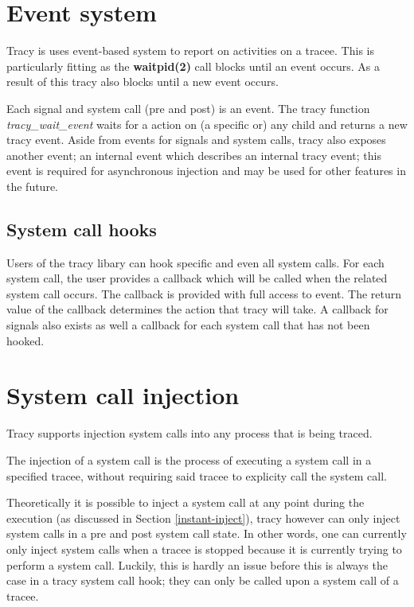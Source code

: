 \documentclass[a4paper, 10pt]{report}
\begin{document}

\section{Event system}

Tracy is uses event-based system to report on activities on a tracee. This is
particularly fitting as the \textbf{waitpid(2)} call blocks until an event
occurs. As a result of this tracy also blocks until a new event occurs.

Each signal and system call (pre and post) is an event.
The tracy function \textit{tracy\_wait\_event} waits for a action on
(a specific or) any child and returns a new tracy event. Aside from
events for signals and system calls, tracy also exposes another event; an
internal event which describes an internal tracy event; this event is required
for asynchronous injection and may be used for other features in the future.

\subsection{System call hooks}

Users of the tracy libary can hook specific and even all system calls. For
each system call, the user provides a callback which will be called when
the related system call occurs. The callback is provided with full access to
event. The return value of the callback determines the action that tracy
will take. A callback for signals also exists as well a callback for each
system call that has not been hooked.

\section{System call injection}

Tracy supports injection system calls into any process that is being traced.

The injection of a system call is the process of executing a system call in
a specified tracee, without requiring said tracee to explicity call the
system call.

Theoretically it is possible to inject a system call at any point during
the execution (as discussed in Section \ref{instant-inject}),
tracy however can only inject system calls in a pre and post
system call state. In other words, one can currently only inject system calls
when a tracee is stopped because it is currently trying to perform a system
call. Luckily, this is hardly an issue before this is always the case in a
tracy system call hook; they can only be called upon a system call of a tracee.
\end{document}
